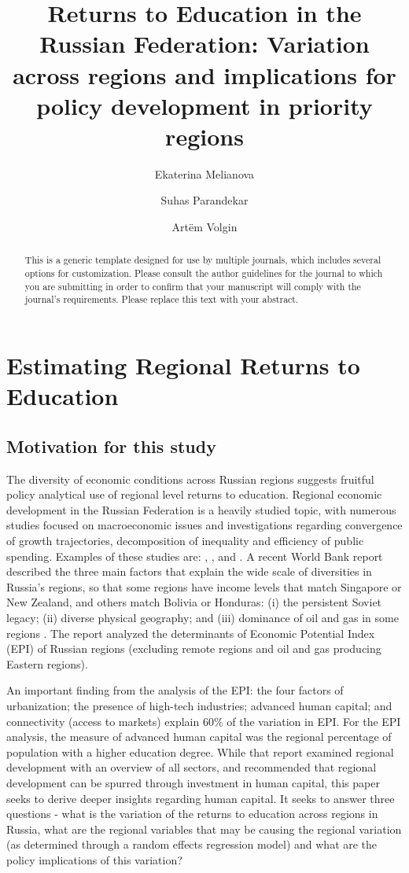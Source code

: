 \documentclass[alpha-refs]{wiley-article-03v}
\title{Returns to Education in the Russian Federation: Variation across regions and implications for policy development in priority regions}
\author[*]{Ekaterina Melianova}
\author[*]{\hspace{-1em}Suhas Parandekar}
\author[*]{\hspace{-1em}Art\"{e}m Volgin}
\affil[*]{Education Global Practice, Europe and Central Asia}
\begin{document}
\maketitle

\begin{abstract}
This is a generic template designed for use by multiple journals, which includes several options for customization. Please consult the author guidelines for the journal to which you are submitting in order to confirm that your manuscript will comply with the journal's requirements. Please replace this text with your abstract.

\end{abstract}


\section{Estimating Regional Returns to Education}

\subsection{Motivation for this study}
The diversity of economic conditions across Russian regions suggests fruitful policy analytical use of regional level returns to education. Regional economic development in the Russian Federation is a heavily studied topic, with numerous studies focused on macroeconomic issues and investigations regarding convergence of growth trajectories, decomposition of inequality and efficiency of public spending. Examples of these studies are: \cite{lugovoy2007}, \cite{hauner2008}, \cite{gluschenko2011} and \cite{kufenko2014}. A recent World Bank report described the three main factors that explain the wide scale of diversities in Russia's regions, so that some regions have income levels that match Singapore or New Zealand, and others match Bolivia or Honduras: (i) the persistent Soviet legacy; (ii) diverse physical geography; and (iii) dominance of oil and gas in some regions \parencite{worldbank2018}. The report analyzed the determinants of Economic Potential Index (EPI) of Russian regions (excluding remote regions and oil and gas producing Eastern regions). 

An important finding from the analysis of the  EPI: the four factors of urbanization; the presence of high-tech industries; advanced human capital; and connectivity (access to markets) \textendash  explain 60\% of the variation in EPI. For the EPI analysis, the measure of advanced human capital was the regional percentage of population with a higher education degree. While that report examined regional development with an overview of all sectors, and recommended that regional development can be spurred through investment in human capital, this paper seeks to derive deeper insights regarding human capital. It seeks to answer three questions - what is the variation of the returns to education across regions in Russia, what are the regional variables that may be causing the regional variation (as determined through a random effects regression model) and what are the policy implications of this variation? 
\end{document}
